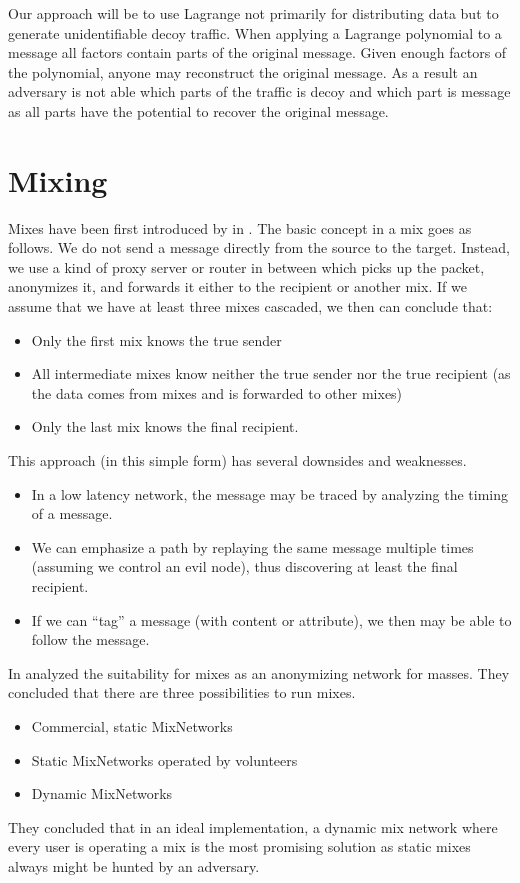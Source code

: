 Our approach will be to use Lagrange not primarily for distributing data but to generate unidentifiable decoy traffic. When applying a Lagrange polynomial to a message all factors contain parts of the original message. Given enough factors of the polynomial, anyone may reconstruct the original message. As a result an adversary is not able which parts of the traffic is decoy and which part is message as all parts have the potential to recover the original message.

\section{Mixing\label{sec:mixNets}}
Mixes have been first introduced by \cite{CHAUM1} in \citeyear{CHAUM1}. The basic concept in a mix goes as follows. We do not send a message directly from the source to the target. Instead, we use a kind of proxy server or router in between which picks up the packet, anonymizes it, and forwards it either to the recipient or another mix. If we assume that we have at least three mixes cascaded, we then can conclude that:
\begin{itemize}
	\item Only the first mix knows the true sender
	\item All intermediate mixes know neither the true sender nor the true recipient (as the data comes from mixes and is forwarded to other mixes) 
	\item Only the last mix knows the final recipient.
\end{itemize}

This approach (in this simple form) has several downsides and weaknesses.

\begin{itemize}
	\item In a low latency network, the message may be traced by analyzing the timing of a message.
	\item We can emphasize a path by replaying the same message multiple times (assuming we control an evil node), thus discovering at least the final recipient.
	\item If we can ``tag'' a message (with content or attribute), we then may be able to follow the message.
\end{itemize}

In \citeyear{RP03-1} \citeauthor{RP03-1} analyzed the suitability for mixes as an anonymizing network for masses. They concluded that there are three possibilities to run mixes.
\begin{itemize}
	\item Commercial, static MixNetworks
	\item Static MixNetworks operated by volunteers
	\item Dynamic MixNetworks
\end{itemize}
They concluded that in an ideal implementation, a dynamic mix network where every user is operating a mix is the most promising solution as static mixes always might be hunted by an adversary.

